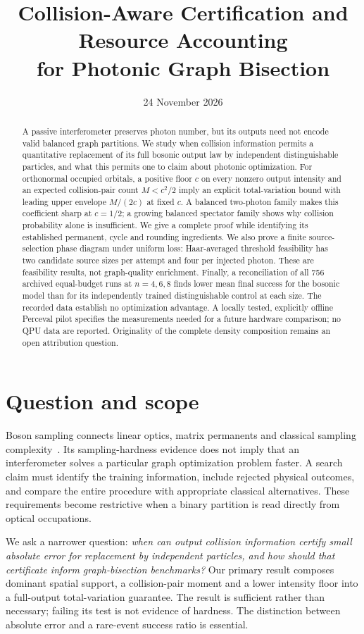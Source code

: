 \documentclass[11pt,a4paper]{article}
\title{Collision-Aware Certification and Resource Accounting\\for Photonic Graph Bisection}
\author{}
\date{24 November 2026}
\theoremstyle{remark}\newtheorem{remark}[theorem]{Remark}
\providecommand{\ErunCount}{756}
\begin{document}
\maketitle
\begin{abstract}
A passive interferometer preserves photon number, but its outputs need not encode valid balanced graph partitions. We study when collision information permits a quantitative replacement of its full bosonic output law by independent distinguishable particles, and what this permits one to claim about photonic optimization. For orthonormal occupied orbitals, a positive floor $c$ on every nonzero output intensity and an expected collision-pair count $M<c^2/2$ imply an explicit total-variation bound with leading upper envelope $M/(2c)$ at fixed $c$. A balanced two-photon family makes this coefficient sharp at $c=1/2$; a growing balanced spectator family shows why collision probability alone is insufficient. We give a complete proof while identifying its established permanent, cycle and rounding ingredients. We also prove a finite source-selection phase diagram under uniform loss: Haar-averaged threshold feasibility has two candidate source sizes per attempt and four per injected photon. These are feasibility results, not graph-quality enrichment. Finally, a reconciliation of all \ErunCount{} archived equal-budget runs at $n=4,6,8$ finds lower mean final success for the bosonic model than for its independently trained distinguishable control at each size. The recorded data establish no optimization advantage. A locally tested, explicitly offline Perceval pilot specifies the measurements needed for a future hardware comparison; no QPU data are reported. Originality of the complete density composition remains an open attribution question.
\end{abstract}
\section{Question and scope}
Boson sampling connects linear optics, matrix permanents and classical sampling complexity~\cite{aaronson2013}. Its sampling-hardness evidence does not imply that an interferometer solves a particular graph optimization problem faster. A search claim must identify the training information, include rejected physical outcomes, and compare the entire procedure with appropriate classical alternatives. These requirements become restrictive when a binary partition is read directly from optical occupations.

We ask a narrower question: \emph{when can output collision information certify small absolute error for replacement by independent particles, and how should that certificate inform graph-bisection benchmarks?} Our primary result composes dominant spatial support, a collision-pair moment and a lower intensity floor into a full-output total-variation guarantee. The result is sufficient rather than necessary; failing its test is not evidence of hardness. The distinction between absolute error and a rare-event success ratio is essential.
\end{document}
